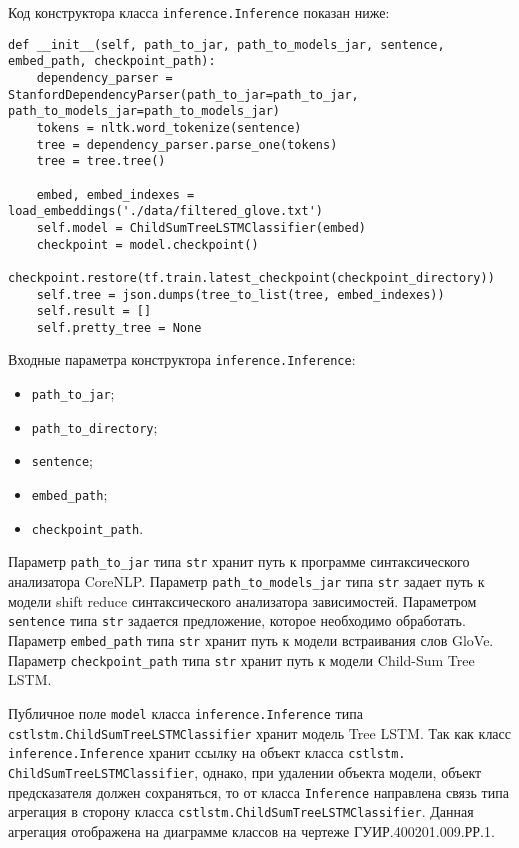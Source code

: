 Код конструктора класса \texttt{inference.Inference} показан ниже:

\medskip
\begin{lstlisting}[style=Python]
  def __init__(self, path_to_jar, path_to_models_jar, sentence, embed_path, checkpoint_path):
    dependency_parser = StanfordDependencyParser(path_to_jar=path_to_jar, path_to_models_jar=path_to_models_jar)
    tokens = nltk.word_tokenize(sentence)
    tree = dependency_parser.parse_one(tokens)
    tree = tree.tree()

    embed, embed_indexes = load_embeddings('./data/filtered_glove.txt')
    self.model = ChildSumTreeLSTMClassifier(embed)
    checkpoint = model.checkpoint()
    checkpoint.restore(tf.train.latest_checkpoint(checkpoint_directory))
    self.tree = json.dumps(tree_to_list(tree, embed_indexes))
    self.result = []
    self.pretty_tree = None
\end{lstlisting}
\medskip

Входные параметра конструктора \texttt{inference.Inference}:
\begin{itemize}
\item \texttt{path\_to\_jar};
\item \texttt{path\_to\_directory};
\item \texttt{sentence};
\item \texttt{embed\_path};
\item \texttt{checkpoint\_path}.
\end{itemize}

Параметр \texttt{path\_to\_jar} типа \texttt{str} хранит путь к программе синтаксического анализатора CoreNLP\@. Параметр \texttt{path\_to\_mo\-dels\_jar} типа \texttt{str} задает путь к модели shift reduce синтаксического анализатора зависимостей. Параметром \texttt{sentence} типа \texttt{str} задается предложение, которое необходимо обработать. Параметр \texttt{embed\_path} типа \texttt{str} хранит путь к модели встраивания слов GloVe. Параметр \texttt{checkpoint\_path} типа \texttt{str} хранит путь к модели Child-Sum Tree LSTM\@.

Публичное поле \texttt{model} класса \texttt{inference.Inference} типа \texttt{cstl\-stm.Ch\-ildSumTreeLSTMClassifier} хранит модель Tree LSTM\@. Так как класс \texttt{inference.Inference} хранит ссылку на объект класса \texttt{cstlstm.} \texttt{Child\-SumTreeLSTMClassifier}, однако, при удалении объекта модели, объект предсказателя должен сохраняться, то от класса \texttt{Inference} направлена связь типа агрегация в сторону класса \texttt{cstlstm.ChildSumTreeLS\-TMClassifi\-er}. Данная агрегация отображена на диаграмме классов на чертеже ГУИР.400201.009.РР.1.

